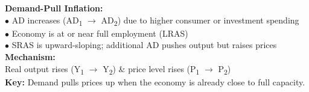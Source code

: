 \documentclass[11pt, a4paper, twoside]{book}
\begin{document}
\begin{diagrambox}
{%
}{%
\textbf{\color{NavyPrimary}Demand-Pull Inflation:}\\[4pt]
$\bullet$ AD increases (AD\textsubscript{1} $\to$ AD\textsubscript{2}) due to higher consumer or investment spending\\[2pt]
$\bullet$ Economy is at or near full employment (LRAS)\\[2pt]
$\bullet$ SRAS is upward-sloping; additional AD pushes output but raises prices\\[4pt]
\textbf{\color{NavyPrimary}Mechanism:}\\[2pt]
Real output rises (Y\textsubscript{1} $\to$ Y\textsubscript{2}) \& price level rises (P\textsubscript{1} $\to$ P\textsubscript{2})\\[4pt]
\textbf{\color{GoldAccent}Key:} Demand pulls prices up when the economy is already close to full capacity.%
}
\end{diagrambox}
\end{document}
